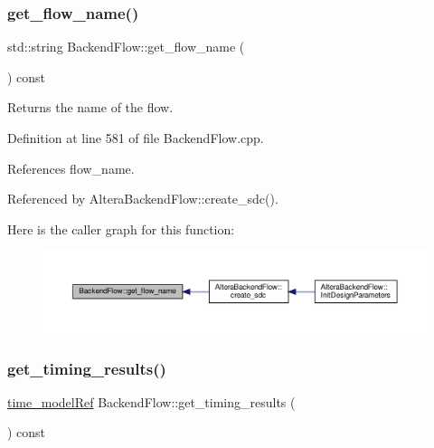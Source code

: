 \subsubsection{\texorpdfstring{get\+\_\+flow\+\_\+name()}{get\_flow\_name()}}
{\footnotesize\ttfamily std\+::string Backend\+Flow\+::get\+\_\+flow\+\_\+name (\begin{DoxyParamCaption}{ }\end{DoxyParamCaption}) const}



Returns the name of the flow. 



Definition at line 581 of file Backend\+Flow.\+cpp.



References flow\+\_\+name.



Referenced by Altera\+Backend\+Flow\+::create\+\_\+sdc().

Here is the caller graph for this function\+:
\nopagebreak
\begin{figure}[H]
\begin{center}
\leavevmode
\includegraphics[width=350pt]{da/d75/classBackendFlow_a419ea98a3481cb6789fc4f216ed231bb_icgraph}
\end{center}
\end{figure}
\mbox{\label{classBackendFlow_a92afaf21ef0bea7c282292bc1e05eb68}} 
\subsubsection{\texorpdfstring{get\+\_\+timing\+\_\+results()}{get\_timing\_results()}}
{\footnotesize\ttfamily \hyperlink{time__model_8hpp_ae203bb7faf1c278333f76fcc6ebe412c}{time\+\_\+model\+Ref} Backend\+Flow\+::get\+\_\+timing\+\_\+results (\begin{DoxyParamCaption}{ }\end{DoxyParamCaption}) const}



